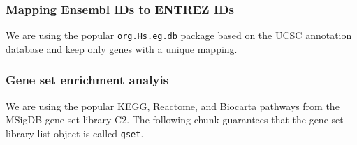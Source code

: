 \documentclass[9pt,a4paper,]{extarticle}
\newenvironment{Shaded}{\begin{snugshade}}{\end{snugshade}}
\newcommand{\KeywordTok}[1]{\textcolor[rgb]{0.13,0.29,0.53}{\textbf{#1}}}
\newcommand{\DataTypeTok}[1]{\textcolor[rgb]{0.13,0.29,0.53}{#1}}
\newcommand{\StringTok}[1]{\textcolor[rgb]{0.31,0.60,0.02}{#1}}
\newcommand{\OperatorTok}[1]{\textcolor[rgb]{0.81,0.36,0.00}{\textbf{#1}}}
\newcommand{\NormalTok}[1]{#1}
\theoremstyle{definition}
\theoremstyle{definition}
\theoremstyle{definition}
\theoremstyle{remark}
\begin{document}
\subsubsection{Mapping Ensembl IDs to ENTREZ IDs}\label{mapping-ensembl-ids-to-entrez-ids}

We are using the popular \texttt{org.Hs.eg.db} package based on the UCSC annotation database and keep only genes with a unique mapping.

\begin{Shaded}
\end{Shaded}

\subsubsection{Gene set enrichment analyis}\label{gene-set-enrichment-analyis}

We are using the popular KEGG, Reactome, and Biocarta pathways from the MSigDB gene set library C2. The following chunk guarantees that the gene set library list object is called \texttt{gset}.
\end{document}
